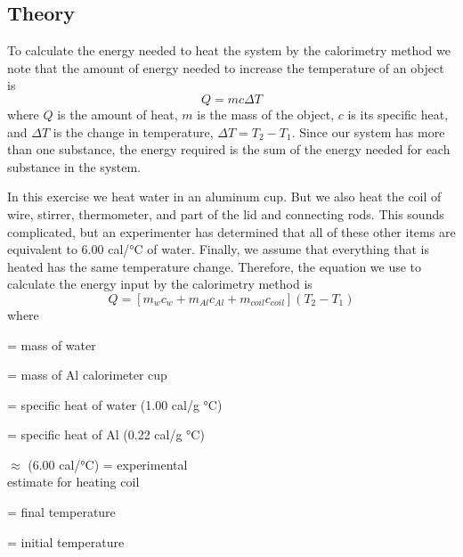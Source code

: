 \begin{multicols}{2}

\section{Theory}
To calculate the energy needed to heat the system by the calorimetry method we note that the amount of energy needed to increase the temperature of an object is
\begin{equation} \label{e:qheat1}
	Q = mc\Delta T 
\end{equation}
where $Q$ is the amount of heat, $m$ is the mass of the object, $c$ is its specific heat, and $\Delta T$ is the change in temperature, $\Delta T =T_2 - T_1$.  Since our system has more than one substance, the energy required is the sum of the energy needed for each substance in the system.

In this exercise we heat water in an aluminum cup.  But we also heat the coil of wire, stirrer, thermometer, and part of the lid and connecting rods.  This sounds complicated, but an experimenter has determined that all of these other items are equivalent to 6.00 cal/\si{\degree}C of water. Finally, we assume that everything that is heated has the same temperature change.  Therefore, the equation we use to calculate the energy input by the calorimetry method is
\begin{equation}\label{e:qheat2}
	Q = [m_wc_w + m_{Al}c_{Al} + m_{coil}c_{coil}](T_2 - T_1)
\end{equation}
where	
\begin{description}[itemsep=1pt]
	\item [$m_w$] = mass of water
	\item [$m_{Al}$]	= mass of Al calorimeter cup
	\item [$c_w$]	= specific heat of water (1.00 cal/g \si{\degree}C)
	\item [$c_{Al}$]	= specific heat of Al (0.22 cal/g \si{\degree}C)
	\item [$m_{coil}c_{coil}$] $\approx$ (6.00 cal/\si{\degree}C) = experimental \\estimate for heating coil
	\item [$T_2$]	= final temperature
	\item [$T_1$]	= initial temperature
\end{description}


\end{multicols}
